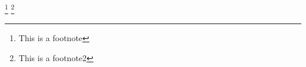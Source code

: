 \documentclass[authoryear, 12pt,5p, times]{elsarticle}
\begin{document}
\footnote{This is a footnote}
\footnote{This is a footnote2}
\end{document}
